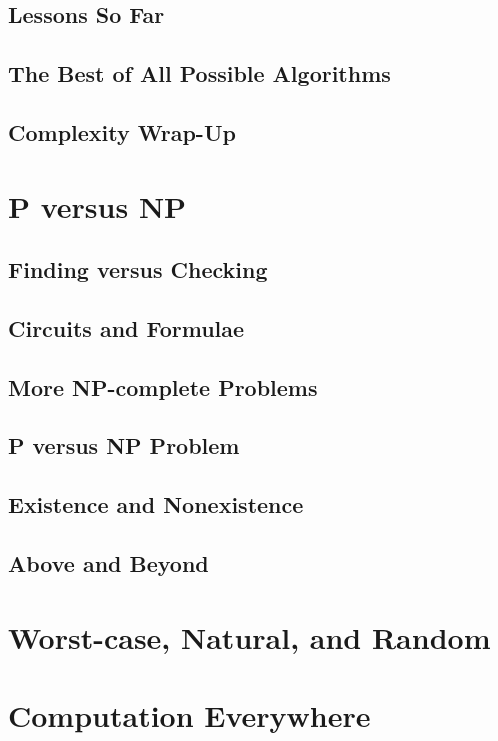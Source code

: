 \documentclass[]{article}
\begin{document}
\subsection{Lessons So Far}

\subsection{The Best of All Possible Algorithms}

\subsection{Complexity Wrap-Up}

\section{P versus NP}
\cite[Chapters 4-6]{moore2011nature}

\subsection{Finding versus Checking}

\subsection{Circuits and Formulae}

\subsection{More NP-complete Problems}

\subsection{P versus NP Problem}

\subsection{Existence and Nonexistence }

\subsection{Above and Beyond}

\section{Worst-case, Natural, and Random}
\cite[Chapters 5,10]{moore2011nature}
\section{Computation Everywhere}
\cite[Chapter 7]{moore2011nature}

\glsaddall
\printglossaries

 


\end{document}
